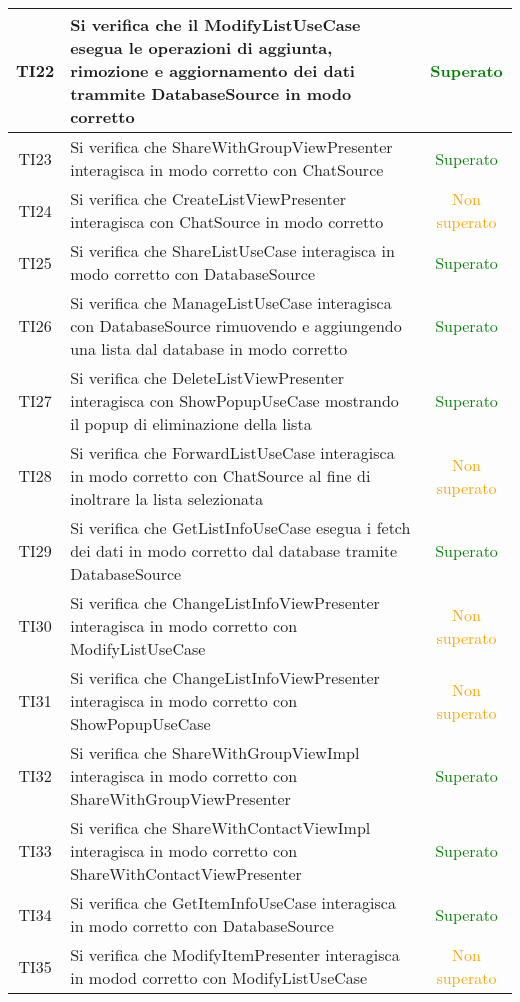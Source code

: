 \begin{center}
\begin{longtable}{|c|>{\centering}m{10cm}|c|}
		TI22 & Si verifica che il ModifyListUseCase esegua le operazioni di aggiunta, rimozione e aggiornamento dei dati trammite DatabaseSource in modo corretto & \textcolor{Green}{Superato}\\ \hline
		TI23 & Si verifica che ShareWithGroupViewPresenter interagisca in modo corretto con ChatSource & \textcolor{Green}{Superato}\\ \hline
		TI24 & Si verifica che CreateListViewPresenter interagisca con ChatSource in modo corretto & \textcolor{Orange}{Non superato}\\ \hline
		TI25 & Si verifica che ShareListUseCase interagisca in modo corretto con DatabaseSource & \textcolor{Green}{Superato}\\ \hline
		TI26 & Si verifica che ManageListUseCase interagisca con DatabaseSource rimuovendo e aggiungendo una lista dal database in modo corretto & \textcolor{Green}{Superato}\\ \hline
		TI27 & Si verifica che DeleteListViewPresenter interagisca con ShowPopupUseCase mostrando il popup di eliminazione della lista & \textcolor{Green}{Superato}\\ \hline
		TI28 & Si verifica che ForwardListUseCase interagisca in modo corretto con ChatSource al fine di inoltrare la lista selezionata & \textcolor{Orange}{Non superato}\\ \hline
		TI29 & Si verifica che GetListInfoUseCase esegua i fetch dei dati in modo corretto dal database tramite DatabaseSource & \textcolor{Green}{Superato}\\ \hline
		TI30 & Si verifica che ChangeListInfoViewPresenter interagisca in modo corretto con ModifyListUseCase & \textcolor{Orange}{Non superato}\\ \hline
		TI31 & Si verifica che ChangeListInfoViewPresenter interagisca in modo corretto con ShowPopupUseCase & \textcolor{Orange}{Non superato}\\ \hline
		TI32 & Si verifica che ShareWithGroupViewImpl interagisca in modo corretto con ShareWithGroupViewPresenter & \textcolor{Green}{Superato}\\ \hline
		TI33 & Si verifica che ShareWithContactViewImpl interagisca in modo corretto con ShareWithContactViewPresenter & \textcolor{Green}{Superato}\\ \hline
		TI34 & Si verifica che GetItemInfoUseCase interagisca in modo corretto con DatabaseSource & \textcolor{Green}{Superato}\\ \hline
		TI35 & Si verifica che ModifyItemPresenter interagisca in modod corretto con ModifyListUseCase & \textcolor{Orange}{Non superato}\\ \hline

\end{longtable}
\end{center}
